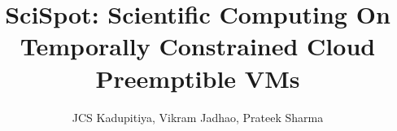\documentclass[compsoc]{IEEEtran}
\begin{document}
\title{SciSpot: Scientific Computing On Temporally Constrained Cloud Preemptible VMs}
\author{JCS Kadupitiya, Vikram Jadhao, Prateek Sharma}
\maketitle 


\begin{abstract}
  
\end{abstract}





%





%

%







%




{


%
}
\end{document}
